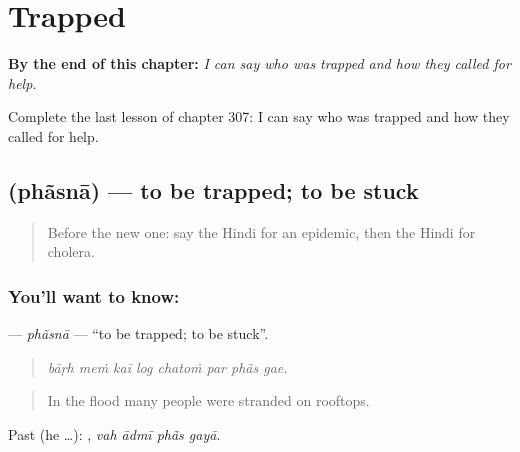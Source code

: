 
\chapter{Trapped}
\label{ch:hi-trapped}

\begin{chapteropening}
\textbf{By the end of this chapter:} \emph{I can say who was trapped and how they called for help.}

Complete the last lesson of chapter 307: I can say who was trapped and how they called for help.
\end{chapteropening}

\section[\texorpdfstring{\hi{फँसना} (phãsnā)}{फँसना (phãsnā)}]{ (phãsnā) — to be trapped; to be stuck}

\label{lesson:HI-C307-phasna}



\begin{quote}
Before the new one: say the Hindi for an epidemic, then the Hindi for cholera.
\end{quote}

\subsection*{You'll want to know: }
\textbf{} — \emph{phãsnā} — \textquotedblleft{}to be trapped; to be stuck\textquotedblright{}.

\begin{quote}
       
\end{quote}

\begin{quote}
\emph{bāṛh meṁ kaī log chatoṁ par phãs gae.}
\end{quote}

\begin{quote}
In the flood many people were stranded on rooftops.
\end{quote}

Past (he …):    , \emph{vah ādmī phãs gayā}.

